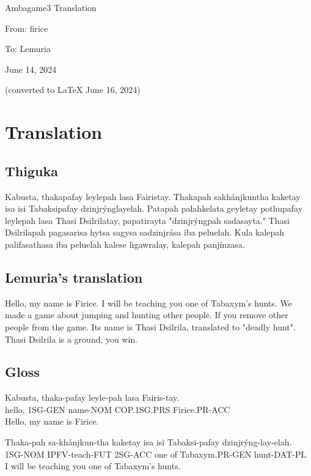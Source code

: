 \documentclass{thiguka}
\begin{document}
Ambagame3 Translation

From: firice

To: Lemuria

June 14, 2024

(converted to \LaTeX{} June 16, 2024)

\section{Translation}
\subsection{Thiguka}

Kabusta, thakapafay leylepah lasa Fairistay. Thakapah sakhánjkuntha kaketay isa isi
Tabaksipafay dzinjrýnglayelah. Patapah palahkelata geyletay pothupafay leylepah lasa
Thasi Dsilrilatay, papatirayta "dzinjrýngpah sadasayta." Thasi Dsilrilapah pagasarisa 
hytsa sagysa sadzinjrása iba peluelah. Kula kalepah palifasathasa iba peluelah kalese 
ligawralay, kalepah panjínzasa.
                            
\subsection{Lemuria's translation}
Hello, my name is Firice. I will be teaching you one of Tabaxym's hunts. We made a
game about jumping and hunting other people. If you remove other people from the
game. Its name is Thasi Dsilrila, translated to "deadly hunt". Thasi Dsilrila is a
ground, you win.


\subsection{Gloss}

\begin{exe}
\ex{} \gll{}Kabusta, thaka-pafay leyle-pah lasa        Fairis-tay.\\
            hello,   1SG-GEN     name-NOM  COP.1SG.PRS Firice.PR-ACC\\
      \glt{}Hello, my name is Firice.
\end{exe}

\begin{exe}
\ex{} \gll{}Thaka-pah sa-khánjkun-tha kaketay isa isi Tabaksi-pafay  dzinjrýng-lay-elah.\\
            1SG-NOM   IPFV-teach-FUT  2SG-ACC one of  Tabaxym.PR-GEN hunt-DAT-PL\\
      \glt{}I will be teaching you one of Tabaxym's hunts.
\end{exe}
\end{document}
